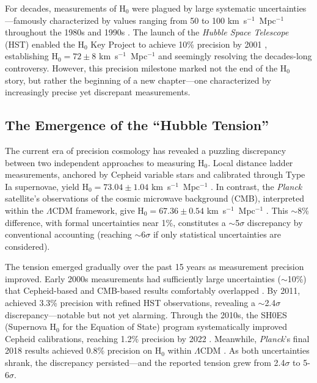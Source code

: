 \documentclass[preprint, linenumbers]{aastex701}
\begin{document}
For decades, measurements of H$_0$ were plagued by large systematic uncertainties---famously characterized by values ranging from 50 to 100 km~s$^{-1}$~Mpc$^{-1}$ throughout the 1980s and 1990s \citep{Freedman2001}. The launch of the \textit{Hubble Space Telescope} (HST) enabled the H$_0$ Key Project to achieve 10\% precision by 2001 \citep{Freedman2001}, establishing H$_0 = 72 \pm 8$ km~s$^{-1}$~Mpc$^{-1}$ and seemingly resolving the decades-long controversy. However, this precision milestone marked not the end of the H$_0$ story, but rather the beginning of a new chapter---one characterized by increasingly precise yet discrepant measurements.

\subsection{The Emergence of the ``Hubble Tension''}

The current era of precision cosmology has revealed a puzzling discrepancy between two independent approaches to measuring H$_0$. Local distance ladder measurements, anchored by Cepheid variable stars and calibrated through Type Ia supernovae, yield H$_0 = 73.04 \pm 1.04$ km~s$^{-1}$~Mpc$^{-1}$ \citep{Riess2022}. In contrast, the \textit{Planck} satellite's observations of the cosmic microwave background (CMB), interpreted within the $\Lambda$CDM framework, give H$_0 = 67.36 \pm 0.54$ km~s$^{-1}$~Mpc$^{-1}$ \citep{Planck2018}. This $\sim$8\% difference, with formal uncertainties near 1\%, constitutes a $\sim$5$\sigma$ discrepancy by conventional accounting (reaching $\sim$6$\sigma$ if only statistical uncertainties are considered).

The tension emerged gradually over the past 15 years as measurement precision improved. Early 2000s measurements had sufficiently large uncertainties ($\sim$10\%) that Cepheid-based and CMB-based results comfortably overlapped \citep{Freedman2001}. By 2011, \citet{Riess2011} achieved 3.3\% precision with refined HST observations, revealing a $\sim$2.4$\sigma$ discrepancy---notable but not yet alarming. Through the 2010s, the SH0ES (Supernova H$_0$ for the Equation of State) program systematically improved Cepheid calibrations, reaching 1.2\% precision by 2022 \citep{Riess2022}. Meanwhile, \textit{Planck}'s final 2018 results achieved 0.8\% precision on H$_0$ within $\Lambda$CDM \citep{Planck2018}. As both uncertainties shrank, the discrepancy persisted---and the reported tension grew from 2.4$\sigma$ to 5-6$\sigma$.
\end{document}
